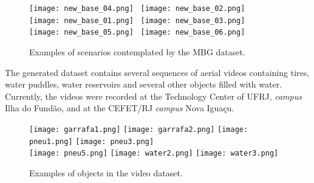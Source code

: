 \begin{figure*}[htb!]
	\centering
	\texttt{[image: new\_base\_04.png]}~
	\vspace{2mm}
	\texttt{[image: new\_base\_02.png]}\\
	\vspace{2mm}
  \texttt{[image: new\_base\_01.png]}~
  \vspace{2mm}
  \texttt{[image: new\_base\_03.png]}\\
	\vspace{2mm}
	\texttt{[image: new\_base\_05.png]}~
	\vspace{2mm}
	\texttt{[image: new\_base\_06.png]}
	\caption{Examples of scenarios contemplated by the MBG dataset.}
	\label{fig:scenarios1}
\end{figure*}



The generated dataset contains several sequences of aerial videos containing tires, water puddles, water reservoirs and several other objects filled with water.
Currently, the videos were recorded at the Technology Center of UFRJ, {\it campus} Ilha do Fundão, and at the CEFET/RJ {\it campus} Nova Iguaçu.
%
\begin{figure*}[htb!]
	\centering
	\texttt{[image: garrafa1.png]}
	\texttt{[image: garrafa2.png]}
	\texttt{[image: pneu1.png]}
	\texttt{[image: pneu3.png]}\\
	\vspace{2mm}
	\texttt{[image: pneu5.png]}
	\texttt{[image: water2.png]}
	\texttt{[image: water3.png]}
	\caption{Examples of objects in the video dataset.}
	\label{fig:objects1}
\end{figure*}


